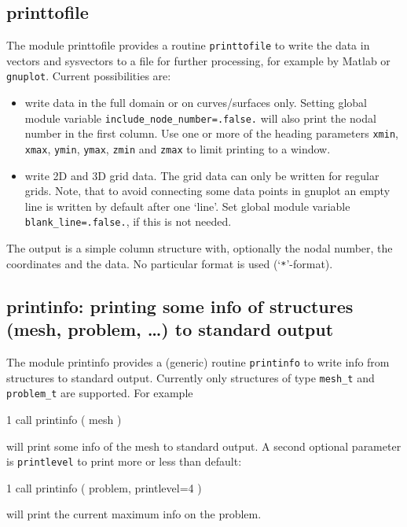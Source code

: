 \subsection{printtofile}
\label{sec:printtofile}

The module printtofile provides a routine \texttt{printtofile} to write the data
in vectors and sysvectors to a file for further processing, for example by
Matlab or \texttt{gnuplot}. Current possibilities are:
\begin{itemize}
   \item write data in the full domain or on curves/surfaces only.
         Setting global module variable
         \texttt{include\_node\_number=.false.} will also print the nodal
         number in the first column.
         Use one or more of the
         heading parameters \texttt{xmin}, \texttt{xmax},
        \texttt{ymin}, \texttt{ymax}, \texttt{zmin} and \texttt{zmax} to
         limit printing to a window.
   \item write 2D and 3D grid data. The grid data can only be written for
         regular grids.
         Note, that to avoid connecting some data points in gnuplot an
         empty line is written by default after one `line'.
         Set global module variable
         \texttt{blank\_line=.false.}, if this is not needed.
\end{itemize}
The output is a simple column structure with, optionally the nodal number,
the coordinates and the data. No particular format is used
(`\texttt{*}'-format).

\subsection{printinfo: printing some info of structures
 (mesh, problem, \ldots) to standard output}
\label{sec:printinfo}

The module printinfo provides a (generic) routine \texttt{printinfo} to write
info from structures to standard output. Currently only structures of type
\texttt{mesh\_t} and \texttt{problem\_t} are supported. For example
\begin{listing}{1}
   call printinfo ( mesh )
\end{listing}
will print some info of the mesh to standard output. A second optional
parameter is \texttt{printlevel} to print more or less than default:
\begin{listing}{1}
   call printinfo ( problem, printlevel=4 )
\end{listing}
will print the current maximum info on the problem.

